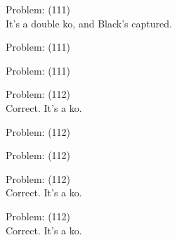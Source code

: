 \documentclass[11pt]{article}
\begin{document}
\begin{minipage}[t]{0.5\textwidth}
  {\centering
  
Problem: (111)\\
It's a double ko, and Black's captured.\\
  }
\end{minipage}
\begin{minipage}[t]{0.5\textwidth}
  {\centering
  
Problem: (111)\\
  }
\end{minipage}
\begin{minipage}[t]{0.5\textwidth}
  {\centering
  
Problem: (111)\\
  }
\end{minipage}
\begin{minipage}[t]{0.5\textwidth}
  {\centering
  
Problem: (112)\\
Correct. It's a ko.\\
  }
\end{minipage}
\begin{minipage}[t]{0.5\textwidth}
  {\centering
  
Problem: (112)\\
  }
\end{minipage}
\begin{minipage}[t]{0.5\textwidth}
  {\centering
  
Problem: (112)\\
  }
\end{minipage}
\begin{minipage}[t]{0.5\textwidth}
  {\centering
  
Problem: (112)\\
Correct. It's a ko.\\
  }
\end{minipage}
\begin{minipage}[t]{0.5\textwidth}
  {\centering
  
Problem: (112)\\
Correct. It's a ko.\\
  }
\end{minipage}
\end{document}
